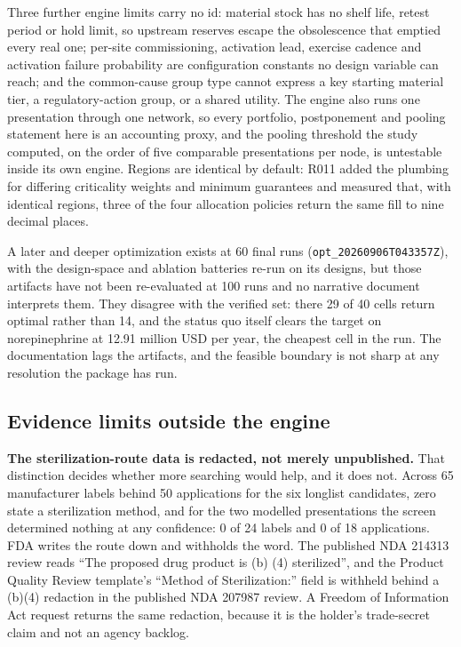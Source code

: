 Three further engine limits carry no id: material stock has no shelf life, retest period or hold
limit, so upstream reserves escape the obsolescence that emptied every real one; per-site
commissioning, activation lead, exercise cadence and activation failure probability are
configuration constants no design variable can reach; and the common-cause group type cannot
express a key starting material tier, a regulatory-action group, or a shared utility. The engine
also runs one presentation through one network, so every portfolio, postponement and pooling
statement here is an accounting proxy, and the pooling threshold the study computed, on the order
of five comparable presentations per node, is untestable inside its own engine. Regions are
identical by default: R011 added the plumbing for differing criticality weights and minimum
guarantees and measured that, with identical regions, three of the four allocation policies return
the same fill to nine decimal places.

A later and deeper optimization exists at 60 final runs (\texttt{opt\_20260906T043357Z}), with the
design-space and ablation batteries re-run on its designs, but those artifacts have not been
re-evaluated at 100 runs and no narrative document interprets them. They disagree with the verified
set: there 29 of 40 cells return optimal rather than 14, and the status quo itself clears the target
on norepinephrine at 12.91 million USD per year, the cheapest cell in the run. The documentation lags
the artifacts, and the feasible boundary is not sharp at any resolution the package has run.

\subsection{Evidence limits outside the engine}

\textbf{The sterilization-route data is redacted, not merely unpublished.} That distinction decides
whether more searching would help, and it does not. Across 65 manufacturer labels behind 50
applications for the six longlist candidates, zero state a sterilization method, and for the two
modelled presentations the screen determined nothing at any confidence: 0 of 24 labels and 0 of 18
applications. FDA writes the route down and withholds the word. The published NDA 214313 review reads
``The proposed drug product is (b) (4) sterilized'', and the Product Quality Review template's
``Method of Sterilization:'' field is withheld behind a (b)(4) redaction in the published NDA 207987
review. A Freedom of Information Act request returns the same redaction, because it is the holder's
trade-secret claim and not an agency backlog.


